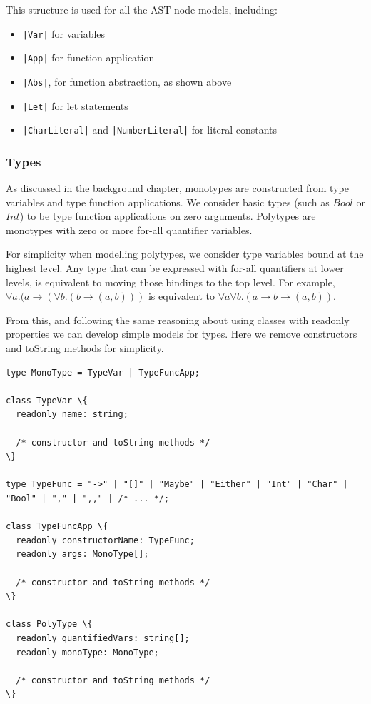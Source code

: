\documentclass[a4paper,fleqn,twoside,12pt]{report}
\begin{document}
This structure is used for all the AST node models, including:
\begin{itemize}
  \item \texttt{|Var|} for variables
  \item \texttt{|App|} for function application
  \item \texttt{|Abs|}, for function abstraction, as shown above
  \item \texttt{|Let|} for let statements
  \item \texttt{|CharLiteral|} and \texttt{|NumberLiteral|} for literal constants
\end{itemize}

\subsubsection{Types}\label{id:h.bzdo56ibho4h}
As discussed in the background chapter, monotypes are constructed from type variables and type function applications. We consider basic types (such as $Bool$ or $Int$) to be type function applications on zero arguments. Polytypes are monotypes with zero or more for-all quantifier variables.

For simplicity when modelling polytypes, we consider type variables bound at the highest level. Any type that can be expressed with for-all quantifiers at lower levels, is equivalent to moving those bindings to the top level. For example, $\forall a. (a \rightarrow (\forall b. (b \rightarrow (a, b)))$ is equivalent to $\forall a \forall b. (a \rightarrow b \rightarrow (a, b))$.

From this, and following the same reasoning about using classes with readonly properties we can develop simple models for types. Here we remove constructors and toString methods for simplicity.

\begin{verbatim}
type MonoType = TypeVar | TypeFuncApp;

class TypeVar \{
  readonly name: string;

  /* constructor and toString methods */
\}

type TypeFunc = "->" | "[]" | "Maybe" | "Either" | "Int" | "Char" | "Bool" | "," | ",," | /* ... */;

class TypeFuncApp \{
  readonly constructorName: TypeFunc;
  readonly args: MonoType[];

  /* constructor and toString methods */
\}

class PolyType \{
  readonly quantifiedVars: string[];
  readonly monoType: MonoType;

  /* constructor and toString methods */
\}
\end{verbatim}
\end{document}
